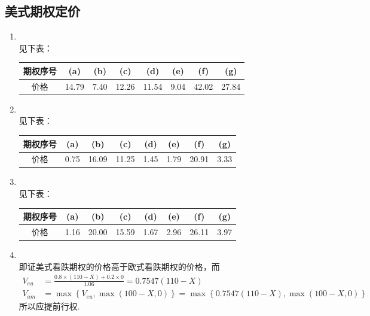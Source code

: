 \subsection{美式期权定价}
\begin{enumerate}
    \item \sol\\
    见下表：
    \begin{table}[H]
        \centering
        \begin{tabular}{|c|c|c|c|c|c|c|c|}
            \hline
            期权序号 & (a) & (b) & (c) & (d) & (e) & (f) & (g) \\ \hline
            价格 & 14.79 & 7.40 & 12.26 & 11.54 & 9.04 & 42.02 & 27.84 \\ \hline
        \end{tabular}
    \end{table}
    \item \sol\\
    见下表：
    \begin{table}[H]
        \centering
        \begin{tabular}{|c|c|c|c|c|c|c|c|}
            \hline
            期权序号 & (a) & (b) & (c) & (d) & (e) & (f) & (g) \\ \hline
            价格 & 0.75 & 16.09 & 11.25 & 1.45 & 1.79 & 20.91 & 3.33 \\ \hline
        \end{tabular}
    \end{table}
    \item \sol\\
    见下表：
    \begin{table}[H]
        \centering
        \begin{tabular}{|c|c|c|c|c|c|c|c|}
            \hline
            期权序号 & (a) & (b) & (c) & (d) & (e) & (f) & (g) \\ \hline
            价格 & 1.16 & 20.00 & 15.59 & 1.67 & 2.96 & 26.11 & 3.97 \\ \hline
        \end{tabular}
    \end{table}
    \item \pro\\
    即证美式看跌期权的价格高于欧式看跌期权的价格，而
    \begin{align*}
        V_{eu} & = \frac{0.8\times(110-X) + 0.2 \times 0}{1.06} = 0.7547(110-X)\\
        V_{am} & = \max\left\{V_{eu}, \max(100 - X, 0)\right\} = \max\left\{0.7547(110-X), \max(100 - X, 0)\right\}
    \end{align*}
    所以应提前行权.
\end{enumerate}
